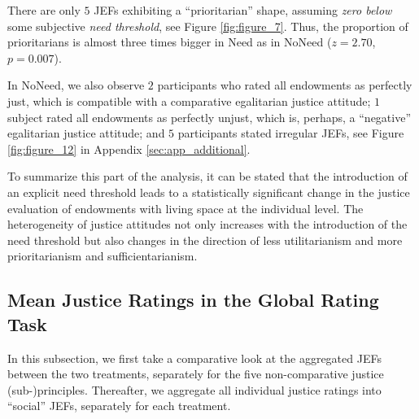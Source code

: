\documentclass[12pt]{scrartcl}
\begin{document}
There are only $5$ JEFs exhibiting a ``prioritarian'' shape, assuming \textit{zero below} some subjective \textit{need threshold}, see Figure \ref{fig:figure_7}.
Thus, the proportion of prioritarians is almost three times bigger in Need as in NoNeed ($z=2.70$, $p=0.007$).

In NoNeed, we also observe $2$ participants who rated all endowments as perfectly just, which is compatible with a comparative egalitarian justice attitude; $1$ subject rated all endowments as perfectly unjust, which is, perhaps, a ``negative'' egalitarian justice attitude; and $5$ participants stated irregular JEFs, see Figure \ref{fig:figure_12} in Appendix \ref{sec:app_additional}.

To summarize this part of the analysis, it can be stated that the introduction of an explicit need threshold leads to a statistically significant change in the justice evaluation of endowments with living space at the individual level.
The heterogeneity of justice attitudes not only increases with the introduction of the need threshold but also changes in the direction of less utilitarianism and more prioritarianism and sufficientarianism.


\subsection{Mean Justice Ratings in the Global Rating Task}\label{sec:global}
In this subsection, we first take a comparative look at the aggregated JEFs between the two treatments, separately for the five non-comparative justice (sub-)principles.
Thereafter, we aggregate all individual justice ratings into ``social'' JEFs, separately for each treatment.
\end{document}
